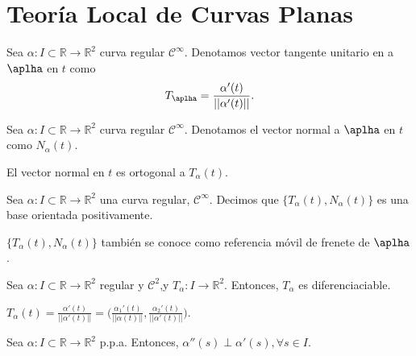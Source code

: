 \section{Teoría Local de Curvas Planas}

\begin{defn}
  Sea $\alpha  : I \subset \mathbb{R} \to \mathbb{R}^{2}$ curva regular $\mathcal{C}^{\infty}$. Denotamos vector tangente unitario en a $\aplha$ en $t$ como
  \[ 
    T_{\aplha} = \frac{\alpha'(t)}{||\alpha'(t)||}. 
  \] 
\end{defn}

\begin{defn}
  Sea $\alpha  : I \subset \mathbb{R} \to \mathbb{R}^{2}$ curva regular $\mathcal{C}^{\infty}$. Denotamos el vector normal a $\aplha$ en $t$ como $N_{\alpha}(t)$.
\end{defn}

\begin{obs}
  El vector normal en $t$ es ortogonal a $T_{\alpha}(t)$.
\end{obs}

\begin{defn}
  Sea $\alpha  : I \subset \mathbb{R} \to \mathbb{R}^{2}$ una curva regular, $\mathcal{C}^{\infty}$. Decimos que $\{ T_{\alpha}(t), N_{\alpha}(t) \}$ es una base orientada positivamente.
\end{defn}

\begin{obs}
  $\{ T_{\alpha}(t), N_{\alpha}(t) \}$ también se conoce como referencia móvil de frenete de $\aplha$.
\end{obs}

\begin{prop}
  Sea $\alpha  : I \subset \mathbb{R} \to \mathbb{R}^{2}$ regular y $\mathcal{C}^{2}$,y $T_{\alpha}: I \to \mathbb{R}^{2}$. Entonces, $T_{\alpha}$ es diferenciaciable.
\end{prop}

\begin{dem}
  $T_{\alpha}(t) = \frac{\alpha'(t)}{||\alpha'(t)||} = \big ( \frac{\alpha_{1}'(t)}{||\alpha(t)||},\frac{\alpha_{2}'(t)}{||\alpha'(t)||}   \big ).$
\end{dem}

\begin{lem}
  Sea $\alpha  : I \subset \mathbb{R} \to \mathbb{R}^{2}$ p.p.a. Entonces, $\alpha''(s) \perp \alpha'(s), \forall s \in I$.
\end{lem}

